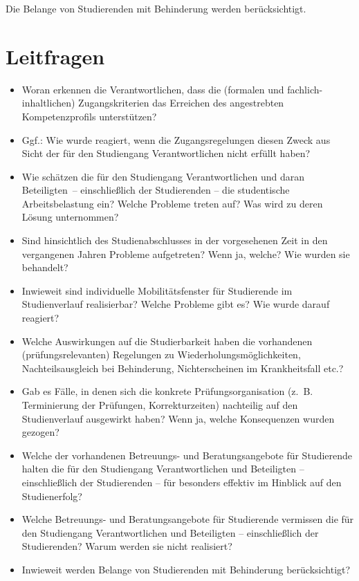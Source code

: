 Die Belange von Studierenden mit Behinderung werden berücksichtigt.

\section{Leitfragen}\label{leitfragen}

\begin{itemize}
\item
  Woran erkennen die Verantwortlichen, dass die (formalen und
  fachlich-inhaltlichen) Zugangskriterien das Erreichen des angestrebten
  Kompetenzprofils unterstützen?
\item
  Ggf.: Wie wurde reagiert, wenn die Zugangsregelungen diesen Zweck aus
  Sicht der für den Studiengang Verantwortlichen nicht erfüllt haben?
\item
  Wie schätzen die für den Studiengang Verantwortlichen und daran
  Beteiligten~-- einschließlich der Studierenden -- die studentische
  Arbeitsbelastung ein? Welche Probleme treten auf? Was wird zu deren
  Lösung unternommen?
\item
  Sind hinsichtlich des Studienabschlusses in der vorgesehenen Zeit in
  den vergangenen Jahren Probleme aufgetreten? Wenn ja, welche? Wie
  wurden sie behandelt?
\item
  Inwieweit sind individuelle Mobilitätsfenster für Studierende im
  Studienverlauf realisierbar? Welche Probleme gibt es? Wie wurde darauf
  reagiert?
\item
  Welche Auswirkungen auf die Studierbarkeit haben die vorhandenen
  (prüfungsrelevanten) Regelungen zu Wiederholungsmöglichkeiten,
  Nachteilsausgleich bei Behinderung, Nichterscheinen im Krankheitsfall
  etc.?
\item
  Gab es Fälle, in denen sich die konkrete Prüfungsorganisation (z.~B.
  Terminierung der Prüfungen, Korrekturzeiten) nachteilig auf den
  Studienverlauf ausgewirkt haben? Wenn ja, welche Konsequenzen wurden
  gezogen?
\item
  Welche der vorhandenen Betreuungs- und Beratungsangebote für
  Studierende halten die für den Studiengang Verantwortlichen und
  Beteiligten -- einschließlich der Studierenden -- für besonders
  effektiv im Hinblick auf den Studienerfolg?
\item
  Welche Betreuungs- und Beratungsangebote für Studierende vermissen die
  für den Studiengang Verantwortlichen und Beteiligten -- einschließlich
  der Studierenden? Warum werden sie nicht realisiert?
\item
  Inwieweit werden Belange von Studierenden mit Behinderung
  berücksichtigt?
\end{itemize}

